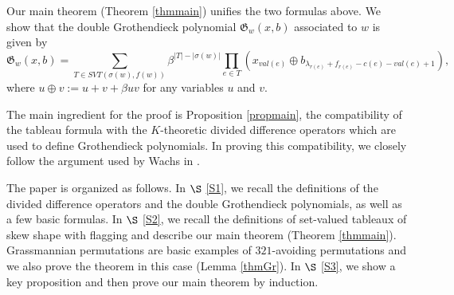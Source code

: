 \documentclass[11pt,reqno,sumlimits]{amsart}
\newcommand{\frakG}{{\mathfrak G}}
\newcommand{\FSVT}{{SVT}}
\theoremstyle{definition}
\numberwithin{equation}{section}
\begin{document}
Our main theorem (Theorem \ref{thmmain}) unifies the two formulas above. We show that the double Grothendieck polynomial $\frakG_w(x,b)$ associated to $w$ is given by
\[
\frakG_w(x,b) = \sum_{T \in \FSVT(\sigma(w),f(w))} \beta^{|T|-|\sigma(w)|}\prod_{e\in T}(x_{val(e)}\oplus b_{\lambda_{r(e)}+f_{r(e)} - c(e) - val(e) + 1}),
\]
where $u\oplus v:=u+v + \beta uv$ for any variables $u$ and $v$.

The main ingredient for the proof is Proposition \ref{propmain}, the compatibility of the tableau formula with the $K$-theoretic divided difference operators which are used to define Grothendieck polynomials. In proving this compatibility, we closely follow the argument used by Wachs in \cite[Lemma 1.1]{Wachs}. 

The paper is organized as follows. In $\S$ \ref{S1}, we recall the definitions of the divided difference operators and the double Grothendieck polynomials, as well as a few basic formulas. In $\S$ \ref{S2}, we recall the definitions of set-valued tableaux of skew shape with flagging and describe our main theorem (Theorem \ref{thmmain}). Grassmannian permutations are basic examples of $321$-avoiding permutations and we also prove the theorem in this case (Lemma \ref{thmGr}). In $\S$ \ref{S3}, we show a key proposition and then prove our main theorem by induction.


\end{document}
